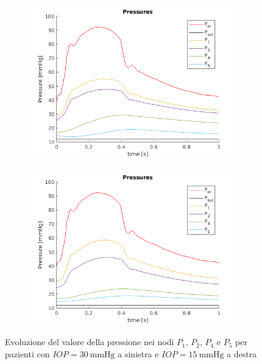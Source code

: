 \documentclass{article}
\begin{document}
\begin{figure}[ht]
\begin{subfigure}{.5\textwidth}
  \centering
  \includegraphics[width=1.0\linewidth]{Pictures/IOP30_part1/pressures_30.png}
\end{subfigure}
\begin{subfigure}{.5\textwidth}
  \centering
  \includegraphics[width=1.0\linewidth]{Pictures/IOP15_part1/pressures_15.png}
\end{subfigure}
\caption{Evoluzione del valore della pressione nei nodi  $P_1$, $P_2$, $P_4$ e $P_5$ per pazienti con $IOP = \SI{30}{\mmHg}$ a sinistra e $IOP = \SI{15}{\mmHg}$ a destra}
\label{pressioni1530}
\end{figure}
\end{document}
